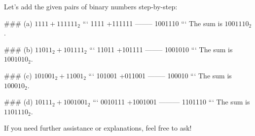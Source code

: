 Let's add the given pairs of binary numbers step-by-step:

### (a) \( 1111 + 111111_{2} \)
```
   1111
+111111
--------
1001110
```
The sum is \(1001110_2\).

### (b) \( 11011_{2} + 101111_{2} \)
```
   11011
+101111
--------
1001010
```
The sum is \(1001010_2\).

### (c) \( 101001_{2} + 11001_{2} \)
```
  101001
+011001
--------
100010
```
The sum is \(100010_2\).

### (d) \( 10111_{2} + 1001001_{2} \)
```
  0010111
+1001001
---------
1101110
```
The sum is \(1101110_2\).

If you need further assistance or explanations, feel free to ask!